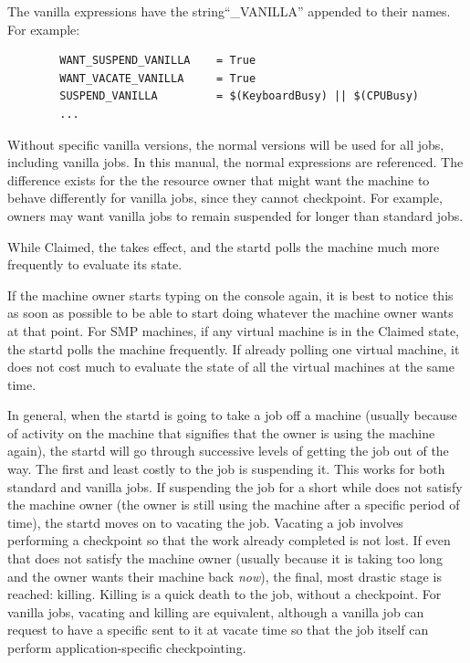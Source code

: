 The vanilla expressions have the string``\_VANILLA'' appended to their names.
For example:
\begin{verbatim}
        WANT_SUSPEND_VANILLA    = True
        WANT_VACATE_VANILLA     = True
        SUSPEND_VANILLA         = $(KeyboardBusy) || $(CPUBusy)
        ...
\end{verbatim}

Without specific vanilla versions, the normal versions
will be used for all jobs, including vanilla jobs.  
In this manual, the normal expressions are referenced.
The difference exists for the
the resource owner that might want the machine
to behave differently for vanilla jobs, since they cannot checkpoint.
For example, owners may want vanilla jobs to remain suspended for
longer than standard jobs.

While Claimed, the  takes effect, and the
startd polls the machine much more frequently to evaluate its
state.

If the machine owner starts typing on the console again,
it is best to notice this as
soon as possible to be able to start doing whatever 
the machine owner wants at that point.
For SMP machines, if any virtual machine is in the Claimed state, the
startd polls the machine frequently.
If already polling one virtual machine, it does not
cost much to evaluate the state of all the virtual machines at
the same time.

In general, when the startd is going to take a job off a machine
(usually because of activity on the machine that signifies that the
owner is using the machine again),
the startd will go through
successive levels of getting the job out of the way.
The first and least costly to the job is suspending it.
This works for both standard and vanilla jobs.
If suspending the job for a short while does not satisfy the machine
owner (the owner is still using the machine after a specific period of
time), the startd moves on to vacating the job.
Vacating a job
involves performing a checkpoint so that the work already completed
is not lost.
If even that does not satisfy the machine owner (usually because it is
taking too long and the owner wants their machine back \emph{now}),
the final, most drastic stage is reached: killing.  
Killing is a quick death to the job, without a checkpoint.  
For vanilla jobs, vacating and killing are equivalent,
although a vanilla job can request to have a specific
sent to it at vacate time so that the job itself can perform
application-specific checkpointing.

